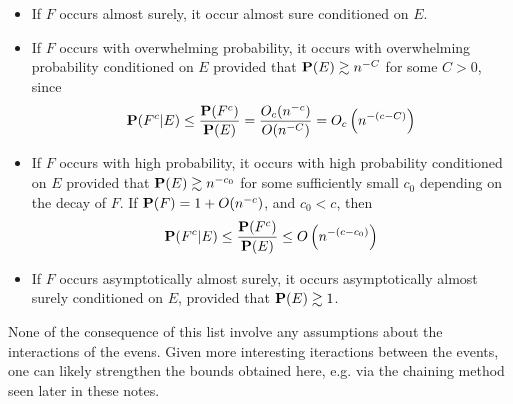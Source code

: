 \begin{itemize}
    \item If $F$ occurs almost surely, it occur almost sure conditioned on $E$.

    \item If $F$ occurs with overwhelming probability, it occurs with overwhelming probability conditioned on $E$ provided that $\operatorname{\mathbf{P}}(E) \gtrsim n^{-C}$ for some $C > 0$, since
    \[ \mathbf{P}(F^c|E) \leq \frac{\mathbf{P}(F^c)}{\mathbf{P}(E)} = \frac{O_c(n^{-c})}{O(n^{-C})} = O_c \left( n^{-(c - C)} \right) \]

    \item If $F$ occurs with high probability, it occurs with high probability conditioned on $E$ provided that $\operatorname{\mathbf{P}}(E) \gtrsim n^{-c_0}$ for some sufficiently small $c_0$ depending on the decay of $F$. If $\mathbf{P}(F) = 1 + O(n^{-c})$, and $c_0 < c$, then
    \[ \mathbf{P}(F^c|E) \leq \frac{\mathbf{P}(F^c)}{\mathbf{P}(E)} \leq O \left(n^{-(c - c_0)} \right) \]

    \item If $F$ occurs asymptotically almost surely, it occurs asymptotically almost surely conditioned on $E$, provided that $\operatorname{\mathbf{P}}(E) \gtrsim 1$.
\end{itemize}

None of the consequence of this list involve any assumptions about the interactions of the evens. Given more interesting iteractions between the events, one can likely strengthen the bounds obtained here, e.g. via the chaining method seen later in these notes.




